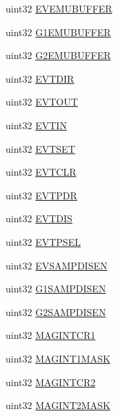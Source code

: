 \begin{DoxyCompactItemize}
\begin{tabbing}
\end{tabbing}\item 
uint32 \mbox{\hyperlink{structadcBase_a57be0f97e1c35e7e7fd3694c119020ca}{E\+V\+E\+M\+U\+B\+U\+F\+F\+ER}}
\item 
uint32 \mbox{\hyperlink{structadcBase_a8d660ad08a38e29361998e016d7a350a}{G1\+E\+M\+U\+B\+U\+F\+F\+ER}}
\item 
uint32 \mbox{\hyperlink{structadcBase_a64642efc2681b98bebfaffbc22d90e52}{G2\+E\+M\+U\+B\+U\+F\+F\+ER}}
\item 
uint32 \mbox{\hyperlink{structadcBase_a73fcd3b437f936e20ca79cdec1e96c8f}{E\+V\+T\+D\+IR}}
\item 
uint32 \mbox{\hyperlink{structadcBase_a9f57384aecd485e5fc10ed8e78065f29}{E\+V\+T\+O\+UT}}
\item 
uint32 \mbox{\hyperlink{structadcBase_a7abea9d12bb1f9ba064f4ce9df651efd}{E\+V\+T\+IN}}
\item 
uint32 \mbox{\hyperlink{structadcBase_afdef5a811a83e4f37bb66a738e6fb559}{E\+V\+T\+S\+ET}}
\item 
uint32 \mbox{\hyperlink{structadcBase_a7eea2dced4784e9fcaac90869b2354d9}{E\+V\+T\+C\+LR}}
\item 
uint32 \mbox{\hyperlink{structadcBase_a7a89221d09c925798ad5f2988067bbee}{E\+V\+T\+P\+DR}}
\item 
uint32 \mbox{\hyperlink{structadcBase_a23cf62731bf696d4de974d979b3d4f99}{E\+V\+T\+D\+IS}}
\item 
uint32 \mbox{\hyperlink{structadcBase_a7f2860c949e118e556d882bd4f77d48f}{E\+V\+T\+P\+S\+EL}}
\item 
uint32 \mbox{\hyperlink{structadcBase_a284d867af22a82914329b74c4a69454a}{E\+V\+S\+A\+M\+P\+D\+I\+S\+EN}}
\item 
uint32 \mbox{\hyperlink{structadcBase_abafe3c373410ea732659b19888d9cabd}{G1\+S\+A\+M\+P\+D\+I\+S\+EN}}
\item 
uint32 \mbox{\hyperlink{structadcBase_a234f42836f7b367bbf392fe87d11ebf2}{G2\+S\+A\+M\+P\+D\+I\+S\+EN}}
\item 
uint32 \mbox{\hyperlink{structadcBase_a7ac5e47c3470829c615a4c9eee47db6b}{M\+A\+G\+I\+N\+T\+C\+R1}}
\item 
uint32 \mbox{\hyperlink{structadcBase_a93f32d86cf47ed5c4a9e92fc9ada7ef8}{M\+A\+G\+I\+N\+T1\+M\+A\+SK}}
\item 
uint32 \mbox{\hyperlink{structadcBase_a5514fd7e877ed1998d23a51c94e940c0}{M\+A\+G\+I\+N\+T\+C\+R2}}
\item 
uint32 \mbox{\hyperlink{structadcBase_abdb0020dc58ba204b2b412cc5125b849}{M\+A\+G\+I\+N\+T2\+M\+A\+SK}}

\end{DoxyCompactItemize}
